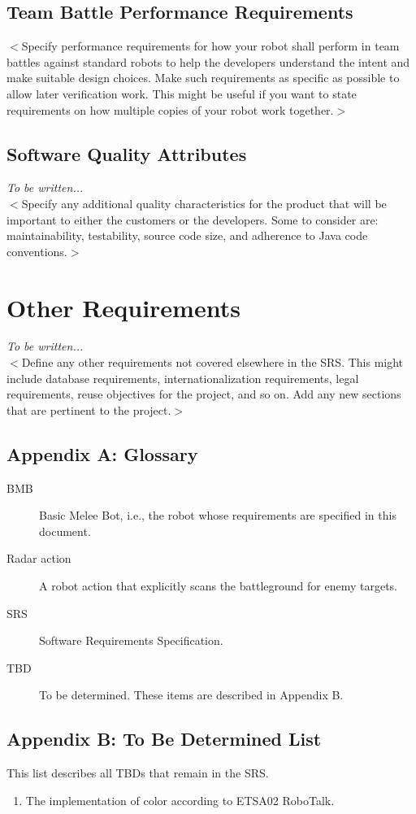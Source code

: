 \documentclass{scrreprt}
\begin{document}
\section{Team Battle Performance Requirements}
$<$Specify performance requirements for how your robot shall perform in team battles against standard robots to help the developers understand the intent and make suitable design choices. Make such requirements as specific as possible to allow later verification work. This might be useful if you want to state requirements on how multiple copies of your robot work together.$>$

\section{Software Quality Attributes}
\textit{To be written...}\\
$<$Specify any additional quality characteristics for the product that will be important to either the customers or the developers. Some to consider are: maintainability, testability, source code size, and adherence to Java code conventions.$>$

\chapter{Other Requirements}
\textit{To be written...}\\
$<$Define any other requirements not covered elsewhere in the SRS. This might include database requirements, internationalization requirements, legal requirements, reuse objectives for the project, and so on. Add any new sections that are pertinent to the project.$>$

\section*{Appendix A: Glossary}

\begin{description}
\item[BMB] Basic Melee Bot, i.e., the robot whose requirements are specified in this document.
\item[Radar action] A robot action that explicitly scans the battleground for enemy targets.
\item[SRS] Software Requirements Specification.
\item[TBD] To be determined. These items are described in Appendix B.
\end{description}

\section*{Appendix B: To Be Determined List}
This list describes all TBDs that remain in the SRS.
\begin{enumerate}
\item The implementation of color according to ETSA02 RoboTalk.
\end{enumerate}
\end{document}

